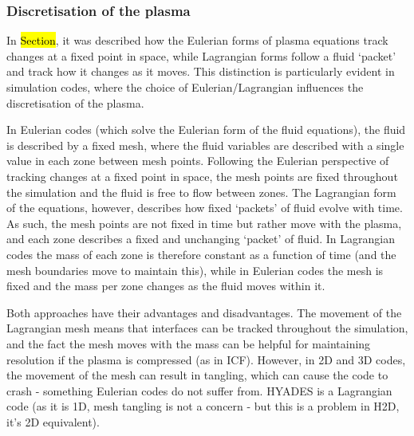 \subsubsection{Discretisation of the plasma}
In \hl{Section}, it was described how the Eulerian forms of plasma equations track changes at a fixed point in space, while Lagrangian forms follow a fluid `packet' and track how it changes as it moves. This distinction is particularly evident in simulation codes, where the choice of Eulerian/Lagrangian influences the discretisation of the plasma.

In Eulerian codes (which solve the Eulerian form of the fluid equations), the fluid is described by a fixed mesh, where the fluid variables are described with a single value in each zone between mesh points. Following the Eulerian perspective of tracking changes at a fixed point in space, the mesh points are fixed throughout the simulation and the fluid is free to flow between zones. The Lagrangian form of the equations, however, describes how fixed `packets' of fluid evolve with time. As such, the mesh points are not fixed in time but rather move with the plasma, and each zone describes a fixed and unchanging `packet' of fluid. In Lagrangian codes the mass of each zone is therefore constant as a function of time (and the mesh boundaries move to maintain this), while in Eulerian codes the mesh is fixed and the mass per zone changes as the fluid moves within it.

Both approaches have their advantages and disadvantages. The movement of the Lagrangian mesh means that interfaces can be tracked throughout the simulation, and the fact the mesh moves with the mass can be helpful for maintaining resolution if the plasma is compressed (as in ICF). However, in 2D and 3D codes, the movement of the mesh can result in tangling, which can cause the code to crash - something Eulerian codes do not suffer from. HYADES is a Lagrangian code (as it is 1D, mesh tangling is not a concern - but this is a problem in H2D, it's 2D equivalent).

